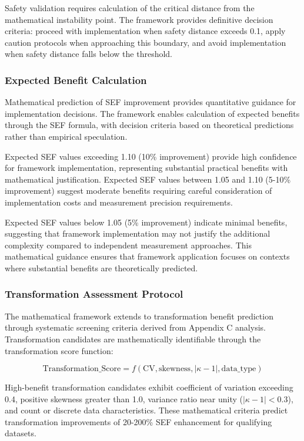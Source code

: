 Safety validation requires calculation of the critical distance from the mathematical instability point. The framework provides definitive decision criteria: proceed with implementation when safety distance exceeds 0.1, apply caution protocols when approaching this boundary, and avoid implementation when safety distance falls below the threshold.

\subsubsection{Expected Benefit Calculation}

Mathematical prediction of SEF improvement provides quantitative guidance for implementation decisions. The framework enables calculation of expected benefits through the SEF formula, with decision criteria based on theoretical predictions rather than empirical speculation.

Expected SEF values exceeding 1.10 (10\% improvement) provide high confidence for framework implementation, representing substantial practical benefits with mathematical justification. Expected SEF values between 1.05 and 1.10 (5-10\% improvement) suggest moderate benefits requiring careful consideration of implementation costs and measurement precision requirements.

Expected SEF values below 1.05 (5\% improvement) indicate minimal benefits, suggesting that framework implementation may not justify the additional complexity compared to independent measurement approaches. This mathematical guidance ensures that framework application focuses on contexts where substantial benefits are theoretically predicted.

\subsubsection{Transformation Assessment Protocol}

The mathematical framework extends to transformation benefit prediction through systematic screening criteria derived from Appendix C analysis. Transformation candidates are mathematically identifiable through the transformation score function:

\begin{equation}
\text{Transformation\_Score} = f(\text{CV}, \text{skewness}, |\kappa-1|, \text{data\_type})
\end{equation}

High-benefit transformation candidates exhibit coefficient of variation exceeding 0.4, positive skewness greater than 1.0, variance ratio near unity ($|\kappa-1| < 0.3$), and count or discrete data characteristics. These mathematical criteria predict transformation improvements of 20-200\% SEF enhancement for qualifying datasets.

